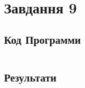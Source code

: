 \section{Завдання 9}
\label{sec:task9}

\subsection{Код Программи}
\label{subsec:task9_code}
\inputminted{python}{../src/task9.py}

\subsection{Результати}
\label{subsec:task9_results}
